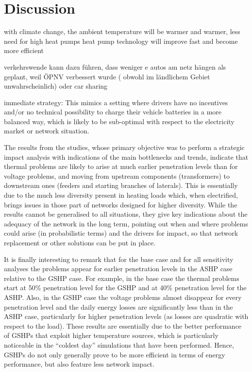 \chapter{Discussion}



with climate change, the ambient temperature will be warmer and warmer, less need for high heat pumps
heat pump technology will improve fast and become more efficient

verkehrswende kann dazu führen, dass weniger e autos am netz hängen als geplant, weil ÖPNV verbessert wurde ( obwohl im ländlichem Gebiet unwahrscheinlich) oder car sharing

immediate strategy: This mimics a setting where drivers have no incentives and/or no technical possibility to charge their vehicle batteries in a more balanced way, which is likely to be sub-optimal with respect to the electricity market or network situation.

The results from the studies, whose primary objective was to perform a strategic impact analysis with indications of the main bottlenecks and trends, indicate that thermal problems are likely to arise at much earlier penetration levels than for voltage problems, and moving from upstream components (transformers) to downstream ones (feeders and starting branches of laterals). This is essentially due to the much less diversity present in heating loads which, when electrified, brings issues in those part of networks designed for higher diversity. While the results cannot be generalised to all situations, they give key indications about the adequacy of the network in the long term, pointing out when and where problems could arise (in probabilistic terms) and the drivers for impact, so that network replacement or other solutions can be put in place.

 It is finally interesting to remark that for the base case and for all sensitivity analyses the problems appear for earlier penetration levels in the ASHP case relative to the GSHP case. For example, in the base case the thermal problems start at 50\% penetration level for the GSHP and at 40\% penetration level for the ASHP. Also, in the GSHP case the voltage problems almost disappear for every penetration level and the daily energy losses are significantly less than in the ASHP case, particularly for higher penetration levels (as losses are quadratic with respect to the load). These results are essentially due to the better performance of GSHPs that exploit higher temperature sources, which is particularly noticeable in the “coldest day” simulations that have been performed. Hence, GSHPs do not only generally prove to be more efficient in terms of energy performance, but also feature less network impact.

